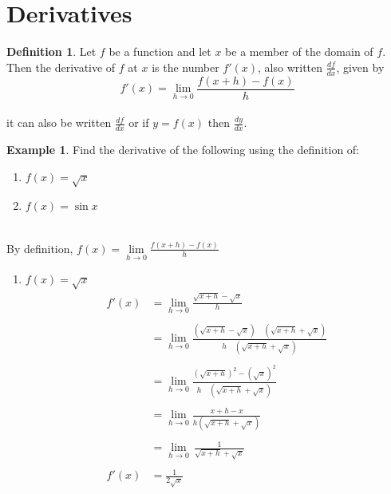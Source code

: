 \documentclass[11pt,a4paper]{article}
\theoremstyle{definition}
\newtheorem{definition}[thm]{Definition}
\newtheorem{example}[thm]{Example}
\begin{document}
\pagebreak
\section{Derivatives}
\begin{definition}

Let $f$ be a function and let $x$ be a member of the domain of $f$. Then the derivative of $f$ at $x$ is the number $f'(x)$, also written $\frac{df}{dx}$, given by\\ $$f'(x)=\lim \limits_{h \longrightarrow 0} \frac{f(x+h)-f(x)}{h}$$\\
it can also be written $\frac{df}{dx}$ or if $y=f(x)$ then $\frac{dy}{dx}$.\\
\end{definition}
\begin{example}

Find the derivative of the following using the definition of:
\begin{enumerate}
\item[(i).] $f(x)=\sqrt{x}$
\item[(ii).] $f(x)=\sin x$\\\\
\end{enumerate}


By definition, $f(x)=\lim \limits_{h \longrightarrow 0} \frac{f(x+h)-f(x)}{h}$\\
\begin{enumerate}
\item[(i).] $f(x)=\sqrt{x}$
\begin{align*}
f'(x) & = \lim_{h \longrightarrow 0} \frac{\sqrt{x+h}-\sqrt{x}}{h}\\\\
 & = \lim_{h \longrightarrow 0} \frac{(\sqrt{x+h}-\sqrt{x})\quad (\sqrt{x+h}+\sqrt{x})}{h \quad (\sqrt{x+h}+\sqrt{x})}\\\\
 & = \lim_{h \longrightarrow 0 } \frac{(\sqrt{x+h})^2-(\sqrt{x})^2}{h\quad (\sqrt{x+h}+\sqrt{x})}\\\\
 & = \lim _{h \longrightarrow 0} \frac{x+h-x}{h(\sqrt{x+h}+\sqrt{x})}\\\\
 & = \lim_{h \longrightarrow 0}\, \frac{1}{\sqrt{x+h}+\sqrt{x}}\\\\
f'(x) & = \frac{1}{2\sqrt{x}}\\\\
\end{align*}



\end{enumerate}
\end{example}
\end{document}
